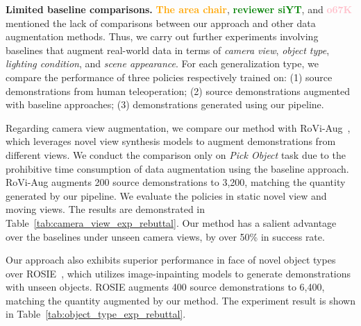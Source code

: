 \documentclass[conference]{IEEEtran}
\newcommand{\rssparagraph}[1]{{\bf #1.}}
\begin{document}
\rssparagraph{Limited baseline comparisons}
\textbf{\textcolor{orange}{The area chair}}, \textbf{\textcolor{green}{reviewer siYT}}, and \textbf{\textcolor{pink}{o67K}} mentioned the lack of comparisons between our approach and other data augmentation methods.
Thus, we carry out further experiments involving baselines that augment real-world data in terms of \textit{camera view}, \textit{object type}, \textit{lighting condition}, and \textit{scene appearance}. 
For each generalization type, we compare the performance of three policies respectively trained on: 
(1) source demonstrations from human teleoperation;
(2) source demonstrations augmented with baseline approaches;
(3) demonstrations generated using our pipeline.

Regarding camera view augmentation, we compare our method with RoVi-Aug~\citep{chen2024rovi}, which leverages novel view synthesis models to augment demonstrations from different views.
We conduct the comparison only on \textit{Pick Object} task due to the prohibitive time consumption of data augmentation using the baseline approach.
RoVi-Aug augments 200 source demonstrations to 3,200, matching the quantity generated by our pipeline.
We evaluate the policies in static novel view and moving views.
The results are demonstrated in Table~\ref{tab:camera_view_exp_rebuttal}.
Our method has a salient advantage over the baselines under unseen camera views, by over 50\% in success rate.


% 


Our approach also exhibits superior performance in face of novel object types over ROSIE~\cite{yu2023scaling}, which utilizes image-inpainting models to generate demonstrations with unseen objects.
ROSIE augments 400 source demonstrations to 6,400, matching the quantity augmented by our method.
The experiment result is shown in Table~\ref{tab:object_type_exp_rebuttal}.
\end{document}
